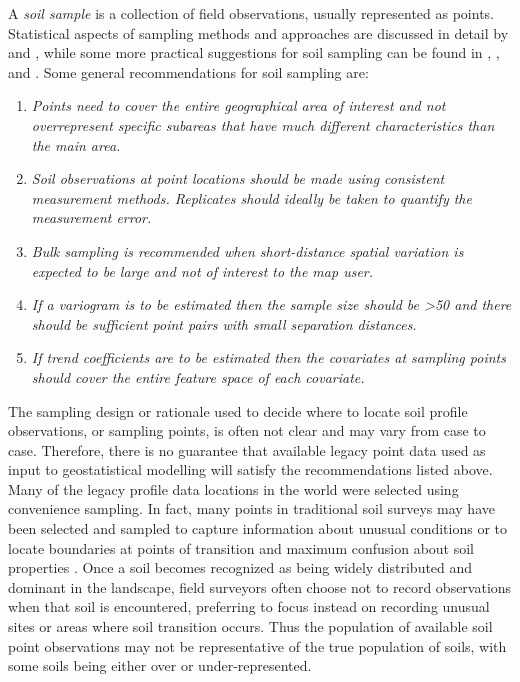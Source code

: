 \documentclass[11pt]{krantz}
\theoremstyle{definition}
\theoremstyle{definition}
\theoremstyle{definition}
\theoremstyle{remark}
\begin{document}
A \emph{soil sample} is a collection of field observations, usually
represented as points. Statistical aspects of sampling methods and
approaches are discussed in detail by
\citet{schabenberger2005statistical} and \citet{deGruijter2006sampling},
while some more practical suggestions for soil sampling can be found in
\citet{pansu2001soil} \citet{Webster2001Wiley}, \citet{tan2005soil}, and
\citet{Legros2006SP}. Some general recommendations for soil sampling
are:

\begin{enumerate}
\def\labelenumi{\arabic{enumi}.}
\item
  \emph{Points need to cover the entire geographical area of interest
  and not overrepresent specific subareas that have much different
  characteristics than the main area.}
\item
  \emph{Soil observations at point locations should be made using
  consistent measurement methods. Replicates should ideally be taken to
  quantify the measurement error.}
\item
  \emph{Bulk sampling is recommended when short-distance spatial
  variation is expected to be large and not of interest to the map
  user.}
\item
  \emph{If a variogram is to be estimated then the sample size should be
  \textgreater{}50 and there should be sufficient point pairs with small
  separation distances.}
\item
  \emph{If trend coefficients are to be estimated then the covariates at
  sampling points should cover the entire feature space of each
  covariate.}
\end{enumerate}

The sampling design or rationale used to decide where to locate soil
profile observations, or sampling points, is often not clear and may
vary from case to case. Therefore, there is no guarantee that available
legacy point data used as input to geostatistical modelling will satisfy
the recommendations listed above. Many of the legacy profile data
locations in the world were selected using convenience sampling. In
fact, many points in traditional soil surveys may have been selected and
sampled to capture information about unusual conditions or to locate
boundaries at points of transition and maximum confusion about soil
properties \citep{Legros2006SP}. Once a soil becomes recognized as being
widely distributed and dominant in the landscape, field surveyors often
choose not to record observations when that soil is encountered,
preferring to focus instead on recording unusual sites or areas where
soil transition occurs. Thus the population of available soil point
observations may not be representative of the true population of soils,
with some soils being either over or under-represented.
\end{document}
